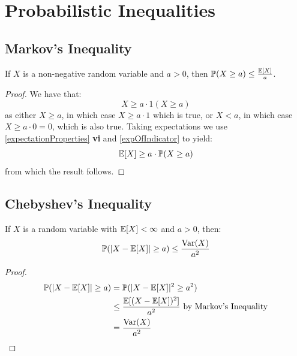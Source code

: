\documentclass[../main.tex]{subfiles}
\begin{document}
\section{Probabilistic Inequalities}
\subsection{Markov's Inequality}
\begin{proposition}
  If $X$ is a non-negative random variable and $a > 0$, then $\mathbb{P}(X \geq a) \leq \frac{\mathbb{E}[X]}{a}$. \label{markovs}
\end{proposition}
\begin{proof}
  We have that:
  \[
    X \geq a \cdot 1(X \geq a)
  \]
  as either $X \geq a$, in which case $X \geq a \cdot 1$ which is true, or $X < a$, in which case $X \geq a \cdot 0 = 0$, which is also true.
  Taking expectations we use \cref{expectationProperties} \textbf{vi} and \cref{expOfIndicator} to yield:
  \[
    \mathbb{E}[X] \geq a \cdot \mathbb{P}(X \geq a)
  \]
  from which the result follows.
\end{proof}
\subsection{Chebyshev's Inequality}
\begin{proposition}
  If $X$ is a random variable with $\mathbb{E}[X] < \infty$ and $a > 0$, then:
  \[
    \mathbb{P}(|X - \mathbb{E}[X]| \geq a) \leq \frac{\operatorname{Var}(X)}{a^2}
  \]
\end{proposition}
\begin{proof}
  \begin{align*}
    \mathbb{P}(|X - \mathbb{E}[X]| \geq a) &= \mathbb{P}(|X - \mathbb{E}[X]|^2 \geq a^2) \\
                           &\leq \frac{\mathbb{E}[(X - \mathbb{E}[X])^2]}{a^2} \text{ by Markov's Inequality} \\
                           &= \frac{\operatorname{Var}(X)}{a^2}
  \end{align*}
\end{proof}
\end{document}
